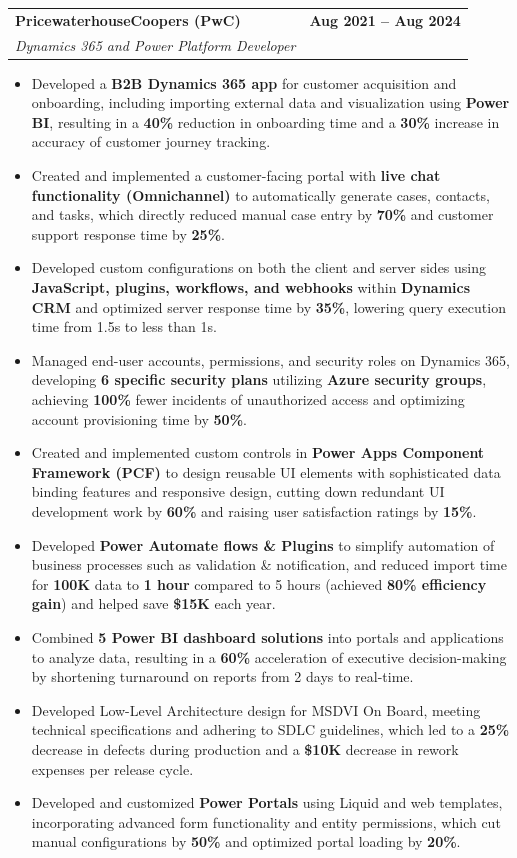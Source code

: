 \documentclass[letterpaper,10pt]{article}
\makeatletter
\newcommand{\resumeItem}[1]{
\item\small{{#1}\vspace{-3.5pt}}
}
\newcommand{\resumeSubheading}[4]{
\vspace{6pt}
\item
\begin{tabular*}{1.0\textwidth}[t]{l@{\extracolsep{\fill}}r}
\textbf{#1} & \textbf{\small #2} \\
\textit{\small#3} & \textit{\small #4} \\
\end{tabular*}\vspace{-5.5pt}
}
\newcommand{\resumeItemListStart}{\begin{itemize}[leftmargin=*, itemsep=0pt, topsep=0pt]}
\newcommand{\resumeItemListEnd}{\end{itemize}\vspace{-3pt}}
\makeatother
\begin{document}
\resumeSubheading
  {PricewaterhouseCoopers (PwC)}{Aug 2021 -- Aug 2024}
  {Dynamics 365 and Power Platform Developer}{}
\resumeItemListStart
  \resumeItem{Developed a \textbf{B2B Dynamics 365 app} for customer acquisition and onboarding, including importing external data and visualization using \textbf{Power BI}, resulting in a \textbf{40\%} reduction in onboarding time and a \textbf{30\%} increase in accuracy of customer journey tracking.}
  \resumeItem{Created and implemented a customer-facing portal with \textbf{live chat functionality (Omnichannel)} to automatically generate cases, contacts, and tasks, which directly reduced manual case entry by \textbf{70\%} and customer support response time by \textbf{25\%}.}
  \resumeItem{Developed custom configurations on both the client and server sides using \textbf{JavaScript, plugins, workflows, and webhooks} within \textbf{Dynamics CRM} and optimized server response time by \textbf{35\%}, lowering query execution time from 1.5s to less than 1s.}
  \resumeItem{Managed end-user accounts, permissions, and security roles on Dynamics 365, developing \textbf{6 specific security plans} utilizing \textbf{Azure security groups}, achieving \textbf{100\%} fewer incidents of unauthorized access and optimizing account provisioning time by \textbf{50\%}.}
  \resumeItem{Created and implemented custom controls in \textbf{Power Apps Component Framework (PCF)} to design reusable UI elements with sophisticated data binding features and responsive design, cutting down redundant UI development work by \textbf{60\%} and raising user satisfaction ratings by \textbf{15\%}.}
  \resumeItem{Developed \textbf{Power Automate flows \& Plugins} to simplify automation of business processes such as validation \& notification, and reduced import time for \textbf{100K} data to \textbf{1 hour} compared to 5 hours (achieved \textbf{80\% efficiency gain}) and helped save \textbf{\$15K} each year.}
  \resumeItem{Combined \textbf{5 Power BI dashboard solutions} into portals and applications to analyze data, resulting in a \textbf{60\%} acceleration of executive decision-making by shortening turnaround on reports from 2 days to real-time.}
  \resumeItem{Developed Low-Level Architecture design for MSDVI On Board, meeting technical specifications and adhering to SDLC guidelines, which led to a \textbf{25\%} decrease in defects during production and a \textbf{\$10K} decrease in rework expenses per release cycle.}
  \resumeItem{Developed and customized \textbf{Power Portals} using Liquid and web templates, incorporating advanced form functionality and entity permissions, which cut manual configurations by \textbf{50\%} and optimized portal loading by \textbf{20\%}.}
\resumeItemListEnd
\end{document}
